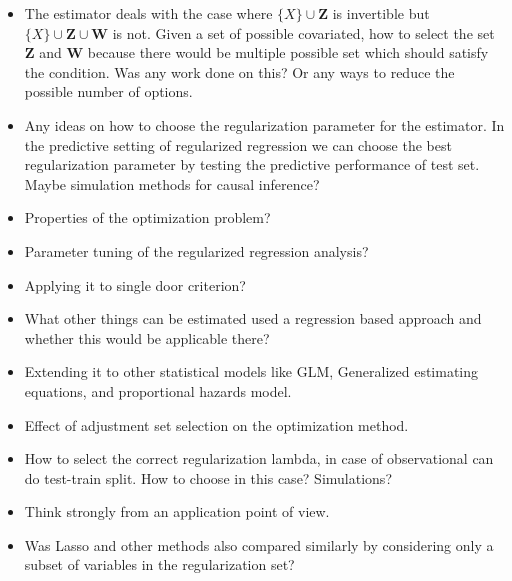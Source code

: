 \documentclass{beamer}
\begin{document}
\begin{frame}
	\begin{itemize}
		\item The estimator deals with the case where $ \{ X \} \cup \bm{Z} $ is invertible but $ \{ X \} \cup \bm{Z} \cup \bm{W} $ is not. Given a set of possible covariated, how to select the set $ \bm{Z} $ and $ \bm{W} $ because there would be multiple possible set which should satisfy the condition. Was any work done on this? Or any ways to reduce the possible number of options.
		\item Any ideas on how to choose the regularization parameter for the estimator. In the predictive setting of regularized regression we can choose the best regularization parameter by testing the predictive performance of test set. Maybe simulation methods for causal inference?
		\item Properties of the optimization problem?
		\item Parameter tuning of the regularized regression analysis?
		\item Applying it to single door criterion?
		\item What other things can be estimated used a regression based approach and whether this would be applicable there?
		\item Extending it to other statistical models like GLM, Generalized estimating equations, and proportional hazards model.
		\item Effect of adjustment set selection on the optimization method.
		\item How to select the correct regularization lambda, in case of observational can do test-train split. How to choose in this case? Simulations?
		\item Think strongly from an application point of view.
		\item Was Lasso and other methods also compared similarly by considering only a subset of variables in the regularization set?
	\end{itemize}
\end{frame}
\end{document}
